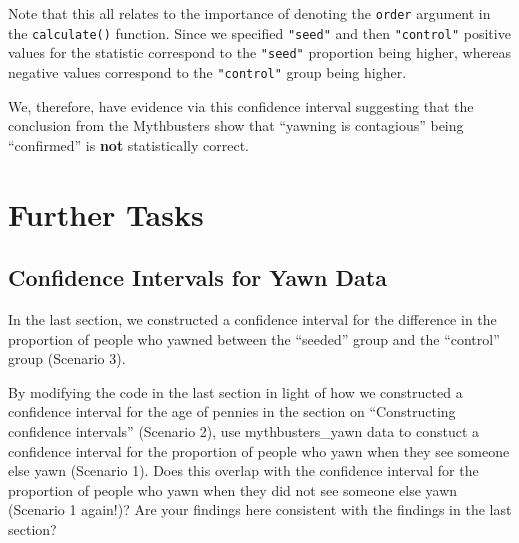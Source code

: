 \documentclass[]{article}
\newenvironment{Shaded}{\begin{snugshade}}{\end{snugshade}}
\newcommand{\KeywordTok}[1]{\textcolor[rgb]{0.13,0.29,0.53}{\textbf{#1}}}
\newcommand{\DataTypeTok}[1]{\textcolor[rgb]{0.13,0.29,0.53}{#1}}
\newcommand{\DecValTok}[1]{\textcolor[rgb]{0.00,0.00,0.81}{#1}}
\newcommand{\StringTok}[1]{\textcolor[rgb]{0.31,0.60,0.02}{#1}}
\newcommand{\OtherTok}[1]{\textcolor[rgb]{0.56,0.35,0.01}{#1}}
\newcommand{\OperatorTok}[1]{\textcolor[rgb]{0.81,0.36,0.00}{\textbf{#1}}}
\newcommand{\NormalTok}[1]{#1}
\begin{document}
Note that this all relates to the importance of denoting the
\texttt{order} argument in the \texttt{calculate()} function. Since we
specified \texttt{"seed"} and then \texttt{"control"} positive values
for the statistic correspond to the \texttt{"seed"} proportion being
higher, whereas negative values correspond to the \texttt{"control"}
group being higher.

We, therefore, have evidence via this confidence interval suggesting
that the conclusion from the Mythbusters show that ``yawning is
contagious'' being ``confirmed'' is \textbf{not} statistically correct.

\section{Further Tasks}\label{further-tasks}

\subsection{Confidence Intervals for Yawn
Data}\label{confidence-intervals-for-yawn-data}

In the last section, we constructed a confidence interval for the
difference in the proportion of people who yawned between the ``seeded''
group and the ``control'' group (Scenario 3).

By modifying the code in the last section in light of how we constructed
a confidence interval for the age of pennies in the section on
``Constructing confidence intervals'' (Scenario 2), use
mythbusters\_yawn data to constuct a confidence interval for the
proportion of people who yawn when they see someone else yawn (Scenario
1). Does this overlap with the confidence interval for the proportion of
people who yawn when they did not see someone else yawn (Scenario 1
again!)? Are your findings here consistent with the findings in the last
section?

\begin{Shaded}
\end{Shaded}
\end{document}
